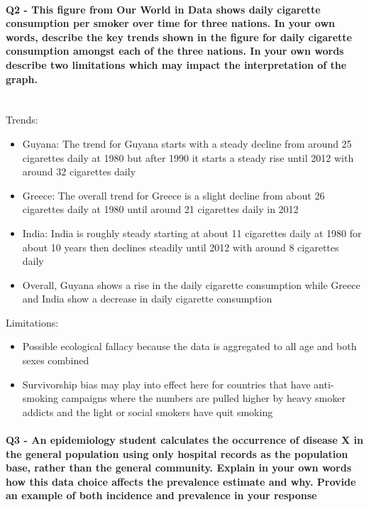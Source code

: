 \documentclass{article}
\begin{document}
\paragraph{Q2 - This figure from Our World in Data shows daily cigarette consumption per smoker over time for
three nations. In your own words, describe the key trends shown in the figure for daily cigarette consumption
amongst each of the three nations. In your own words describe two limitations which may impact the interpretation of the graph.} \mbox{} \\
Trends:
\begin{itemize}
    \item Guyana: The trend for Guyana starts with a steady decline from around 25 cigarettes daily at 1980 but after 1990 it starts a steady rise until 2012 with around 32 cigarettes daily
    \item Greece: The overall trend for Greece is a slight decline from about 26 cigarettes daily at 1980 until around 21 cigarettes daily in 2012
    \item India: India is roughly steady starting at about 11 cigarettes daily at 1980 for about 10 years then declines steadily until 2012 with around 8 cigarettes daily
    \item Overall, Guyana shows a rise in the daily cigarette consumption while Greece and India show a decrease in daily cigarette consumption
\end{itemize}
Limitations:
\begin{itemize}
    \item Possible ecological fallacy because the data is aggregated to all age and both sexes combined
    \item Survivorship bias may play into effect here for countries that have anti-smoking campaigns where the numbers are pulled higher by heavy smoker addicts and the light or social smokers have quit smoking
\end{itemize}

\paragraph{Q3 - An epidemiology student calculates the occurrence of disease X in the general population using
only hospital records as the population base, rather than the general community.
Explain in your own words how this data choice affects the prevalence estimate and why.
Provide an example of both incidence and prevalence in your response} \mbox{} \\
\end{document}
